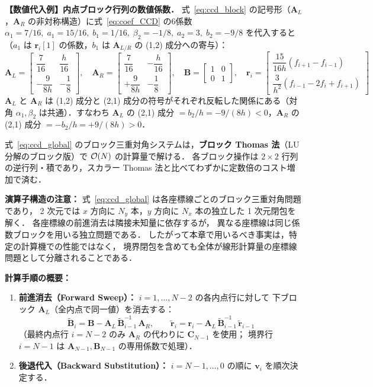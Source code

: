 \noindent\textbf{【数値代入例】内点ブロック行列の数値係数．}
式~\eqref{eq:ccd_block} の記号形（$\mathbf{A}_L$，$\mathbf{A}_R$ の非対称構造）に式~\eqref{eq:coef_CCD} の6係数 $\alpha_1=7/16,\;a_1=15/16,\;b_1=1/16,\;\beta_2=-1/8,\;a_2=3,\;b_2=-9/8$ を代入すると
（$a_1$ は $\mathbf{r}_i[1]$ の係数，$b_1$ は $\mathbf{A}_{L/R}$ の (1,2) 成分への寄与）：
\[
  \mathbf{A}_L =
  \begin{bmatrix}
    \dfrac{7}{16} & \dfrac{h}{16} \\[8pt]
    -\dfrac{9}{8h} & -\dfrac{1}{8}
  \end{bmatrix},
  \quad
  \mathbf{A}_R =
  \begin{bmatrix}
    \dfrac{7}{16} & -\dfrac{h}{16} \\[8pt]
    +\dfrac{9}{8h} & -\dfrac{1}{8}
  \end{bmatrix},
  \quad
  \mathbf{B} =
  \begin{bmatrix}
    1 & 0 \\
    0 & 1
  \end{bmatrix},
  \quad
  \mathbf{r}_i =
  \begin{bmatrix}
    \dfrac{15}{16h}(f_{i+1}-f_{i-1}) \\[8pt]
    \dfrac{3}{h^2}(f_{i-1}-2f_i+f_{i+1})
  \end{bmatrix}
\]
$\mathbf{A}_L$ と $\mathbf{A}_R$ は (1,2) 成分と (2,1) 成分の符号がそれぞれ反転した関係にある（対角 $\alpha_1,\beta_2$ は共通）．すなわち $\mathbf{A}_L$ の (2,1) 成分 $= b_2/h = -9/(8h) < 0$，$\mathbf{A}_R$ の (2,1) 成分 $= -b_2/h = +9/(8h) > 0$．

\medskip

\noindent 式~\eqref{eq:ccd_global} のブロック三重対角システムは，\textbf{ブロック Thomas 法}（LU 分解のブロック版）で $\mathcal{O}(N)$ の計算量で解ける．
各ブロック操作は $2\times2$ 行列の逆行列・積であり，スカラー Thomas 法と比べてわずかに定数倍のコスト増加で済む．

\noindent\textbf{演算子構造の注意：}
式~\eqref{eq:ccd_global} は各座標線ごとのブロック三重対角問題であり，
2 次元では $x$ 方向に $N_y$ 本，$y$ 方向に $N_x$ 本の独立した 1 次元閉包を解く．
各座標線の前進消去は隣接未知量に依存するが，
異なる座標線は同じ係数ブロックを用いる独立問題である．
したがって本章で用いるべき事実は，特定の計算機での性能ではなく，
境界閉包を含めても全体が線形計算量の座標線問題として分離されることである．

\textbf{計算手順の概要：}
\begin{enumerate}
  \item \textbf{前進消去（Forward Sweep）：} $i = 1, \dots, N-2$ の各内点行に対して
        下ブロック $\mathbf{A}_L$（全内点で同一値）を消去する：
        \[
          \tilde{\mathbf{B}}_i = \mathbf{B} - \mathbf{A}_L\,\tilde{\mathbf{B}}_{i-1}^{-1}\,\mathbf{A}_R,
          \qquad
          \tilde{\mathbf{r}}_i = \mathbf{r}_i - \mathbf{A}_L\,\tilde{\mathbf{B}}_{i-1}^{-1}\,\tilde{\mathbf{r}}_{i-1}
        \]
        （最終内点行 $i=N-2$ のみ $\mathbf{A}_R$ の代わりに $\mathbf{C}_{N-1}$ を使用；
        境界行 $i=N-1$ は $\mathbf{A}_{N-1}, \mathbf{B}_{N-1}$ の専用係数で処理）．
  \item \textbf{後退代入（Backward Substitution）：} $i = N-1, \dots, 0$ の順に $\bm{v}_i$ を順次決定する．
\end{enumerate}

